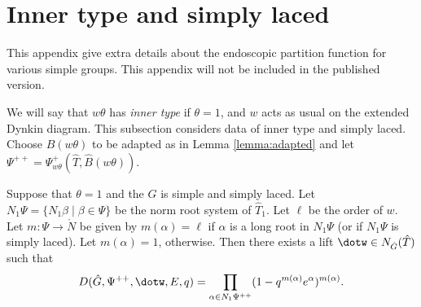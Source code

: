 


\section{Inner type and simply laced}  

This appendix give extra details about the endoscopic partition function
for various simple groups.  This appendix will not be included in the published version.

We will say that $w\theta$ has {\it inner type} if $\theta=1$, and $w$
acts as usual on the extended Dynkin diagram.  This subsection
considers data of inner type and simply laced.  Choose $\hat
B(w\theta)$ to be adapted as in Lemma \ref{lemma:adapted} and let
$\Psi^{++} = \Psi_{w\theta}^+(\hat T,\hat B(w\theta))$.

\begin{proposition}\label{lemma:inner} 
  Suppose that $\theta=1$ and the $\hat G$ is simple and simply laced.
  Let $N_1\Psi=\{N_1\beta\mid \beta\in \Psi\}$ be the norm root system
  of $\hat T_1$. Let $\ell$ be the order of $w$.  Let $m:\Psi\to
  \ring{N}$ be given by $m(\alpha)=\ell$ if $\alpha$ is a long root in
  $N_1\Psi$ (or if $N_1\Psi$ is simply laced).  Let $m(\alpha) = 1$,
  otherwise.  Then there exists a lift $\dotw\in N_{\hat G}(\hat T)$
  such that
\begin{equation}\label{eqn:laced}
D(\hat G,\Psi^{++},\dotw,E,q) 
= \prod_{\alpha\in N_1\Psi^{++}} (1- q^{m(\alpha)} e^\alpha)^{m(\alpha)}.
\end{equation}
\end{proposition}


